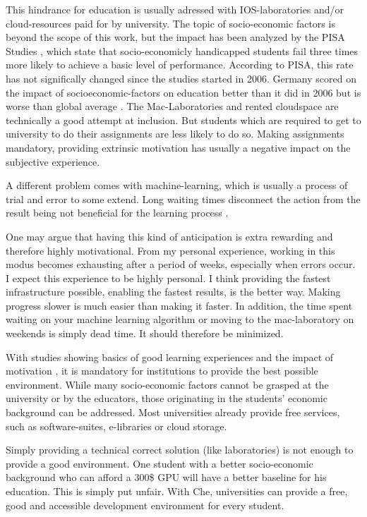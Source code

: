 \documentclass[utf8]{lni}
\begin{document}
This  hindrance  for  education  is  usually adressed  with  IOS-laboratories  and/or  cloud-resources paid for by university. 
The topic of socio-economic factors is beyond the scope of this work, but the impact has been analyzed by the PISA Studies \cite{PISA15}, which state that socio-economicly handicapped students fail three times more likely to achieve a basic level of performance.
According to PISA, this rate has not significally changed since the studies started in 2006. 
Germany scored on the impact of socioeconomic-factors on education better than it did in 2006 but is worse than global average \cite{OECDCN15}.
The Mac-Laboratories and rented cloudspace are technically a good attempt at inclusion. 
But students which are required to get to university to do their assignments are 
less  likely  to  do  so.
Making  assignments  mandatory, providing extrinsic motivation \cite{DECI93} has usually a negative impact on the subjective experience.

A different problem comes with machine-learning, which is usually a process of trial and error to some extend.
Long waiting times disconnect the action from the result being not beneficial for the learning process \cite{HU95}\cite{DECI93}. 

One may argue that having this kind of anticipation is extra rewarding and therefore highly motivational.
From my personal experience, working in this modus becomes exhausting after a period of weeks, especially when errors occur. 
I expect this experience to be highly personal. 
I think providing the fastest infrastructure possible, enabling the fastest results, is the better way. 
Making progress slower is much easier than making it faster.  
In addition, the time spent waiting on your machine learning algorithm or moving to the mac-laboratory on weekends is simply dead time. 
It should therefore be minimized.   

With studies showing basics of good learning experiences \cite{FI05}\cite{TC88} and the impact of motivation \cite{HU95}\cite{DECI93}, it is mandatory for institutions to provide the best possible environment. 
While many socio-economic factors cannot be grasped at the university or by the educators, those originating in the students' economic background can be addressed.
Most universities already provide free services, such as software-suites, e-libraries or cloud storage.

Simply providing a technical correct solution (like laboratories) is not enough to provide a good environment.
One student with a better socio-economic background who can afford a 300\$ GPU will have a better baseline for his education. 
This is simply put unfair.
With Che, universities can provide a free, good and accessible development environment for every student.
\end{document}
